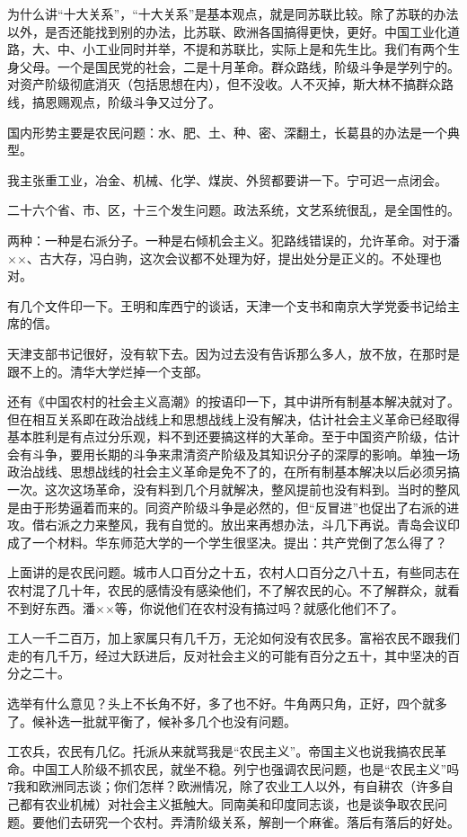 为什么讲“十大关系”，“十大关系”是基本观点，就是同苏联比较。除了苏联的办法以外，是否还能找到别的办法，比苏联、欧洲各国搞得更快，更好。中国工业化道路，大、中、小工业同时并举，不提和苏联比，实际上是和先生比。我们有两个生身父母。一个是国民党的社会，二是十月革命。群众路线，阶级斗争是学列宁的。对资产阶级彻底消灭（包括思想在内），但不没收。人不灭掉，斯大林不搞群众路线，搞恩赐观点，阶级斗争又过分了。

国内形势主要是农民问题：水、肥、土、种、密、深翻土，长葛县的办法是一个典型。

我主张重工业，冶金、机械、化学、煤炭、外贸都要讲一下。宁可迟一点闭会。

二十六个省、市、区，十三个发生问题。政法系统，文艺系统很乱，是全国性的。

两种：一种是右派分子。一种是右倾机会主义。犯路线错误的，允许革命。对于潘××、古大存，冯白驹，这次会议都不处理为好，提出处分是正义的。不处理也对。

有几个文件印一下。王明和库西宁的谈话，天津一个支书和南京大学党委书记给主席的信。

天津支部书记很好，没有软下去。因为过去没有告诉那么多人，放不放，在那时是跟不上的。清华大学烂掉一个支部。

还有《中国农村的社会主义高潮》的按语印一下，其中讲所有制基本解决就对了。但在相互关系即在政治战线上和思想战线上没有解决，估计社会主义革命已经取得基本胜利是有点过分乐观，料不到还要搞这样的大革命。至于中国资产阶级，估计会有斗争，要用长期的斗争来肃清资产阶级及其知识分子的深厚的影响。单独一场政治战线、思想战线的社会主义革命是免不了的，在所有制基本解决以后必须另搞一次。这次这场革命，没有料到几个月就解决，整风提前也没有料到。当时的整风是由于形势逼着而来的。同资产阶级斗争是必然的，但“反冒进”也促出了右派的进攻。借右派之力来整风，我有自觉的。放出来再想办法，斗几下再说。青岛会议印成了一个材料。华东师范大学的一个学生很坚决。提出：共产党倒了怎么得了？

上面讲的是农民问题。城市人口百分之十五，农村人口百分之八十五，有些同志在农村混了几十年，农民的感情没有感染他们，不了解农民的心。不了解群众，就看不到好东西。潘××等，你说他们在农村没有搞过吗？就感化他们不了。

工人一千二百万，加上家属只有几千万，无沦如何没有农民多。富裕农民不跟我们走的有几千万，经过大跃进后，反对社会主义的可能有百分之五十，其中坚决的百分之二十。

选举有什么意见？头上不长角不好，多了也不好。牛角两只角，正好，四个就多了。候补选一批就平衡了，候补多几个也没有问题。

工农兵，农民有几亿。托派从来就骂我是“农民主义”。帝国主义也说我搞农民革命。中国工人阶级不抓农民，就坐不稳。列宁也强调农民问题，也是“农民主义”吗7我和欧洲同志谈；你们怎样？欧洲情况，除了农业工人以外，有自耕农（许多自己都有农业机械）对社会主义抵触大。同南美和印度同志谈，也是谈争取农民问题。要他们去研究一个农村。弄清阶级关系，解剖一个麻雀。落后有落后的好处。

